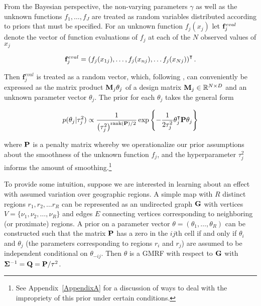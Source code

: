 From the Bayesian perspective, the non-varying parameters $\gamma$ as well as the unknown 
functions $f_1, \dots, f_J$ are treated as random variables distributed according to priors that must 
be specified. For an unknown function $f_j(x_j)$ let $\mathbf{f}_j^{eval}$ denote the vector of function 
evaluations of $f_j$ at each of the $N$ observed values of $x_j$ 

\begin{equation*}
\mathbf{f}_j^{eval} = \left(f_j(x_{1j}), \dots, f_j(x_{nj}), \dots f_j(x_{Nj})\right)^\intercal.  
 \end{equation*}
 
\noindent Then $\mathbf{f}_j^{eval}$ is treated as a random vector, which, following 
, can conveniently be expressed as the matrix product 
$\mathbf{M}_j \theta_j$ of a design matrix $\mathbf{M}_j \in \mathbb{R}^{N \times D}$ and an 
unknown parameter vector $\theta_j$. The prior for each $\theta_j$  takes the general form

\begin{equation*}
p(\theta_j | \tau^2_j) 
\propto 
\frac{1}{\left(\tau^2_j\right)^{{\rm rank}(\mathbf{P})/2} }
\exp{\left\{-\frac{1}{2\tau^2_j} \theta_j^\intercal \mathbf{P} \theta_j\right\}}
\end{equation*}

\noindent where $\mathbf{P}$ is a penalty matrix whereby we operationalize our prior assumptions 
about the smoothness of the unknown function $f_j$, and the hyperparameter $\tau^2_j$
informs the amount of smoothing.\footnote{See Appendix~\ref{AppendixA} 
for a discussion of ways to deal with the impropriety of this prior under certain conditions.}

To provide some intuition, suppose we are interested in learning about an effect with assumed 
variation over geographic regions.  A simple map with $R$ distinct regions $r_1, r_2, \dots r_R$ can 
be represented as an undirected graph $\mathbf{G}$ with vertices $V = \{\nu_1, \nu_2, \dots, \nu_R\}$ and 
edges $E$ connecting vertices corresponding to neighboring (or proximate) regions. A prior on a 
parameter vector $\theta = (\theta_1, \dots, \theta_R)$ can be constructed such that the matrix 
$\mathbf{P}$ has a zero in the $ij$th cell if and only if $\theta_i$ and $\theta_j$ (the parameters 
corresponding to regions $r_i$ and $r_j$) are assumed to be independent conditional on 
$\theta_{-ij}$. Then $\theta$ is a GMRF with respect to $\mathbf{G}$ with 
$\boldsymbol{\Sigma}^{-1} = \mathbf{Q} = \mathbf{P}/\tau^2$. 


